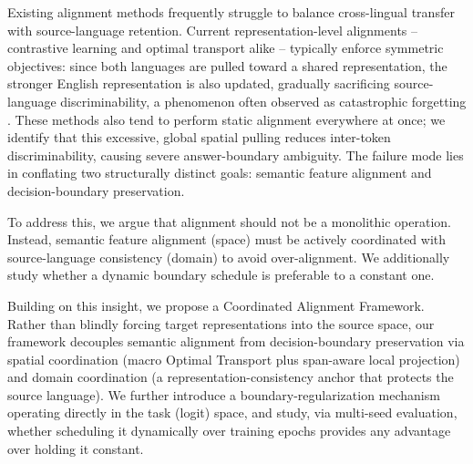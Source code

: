 \documentclass[11pt]{article}
\begin{document}
Existing alignment methods frequently struggle to balance cross-lingual transfer with source-language retention. Current representation-level alignments -- contrastive learning and optimal transport alike -- typically enforce symmetric objectives: since both languages are pulled toward a shared representation, the stronger English representation is also updated, gradually sacrificing source-language discriminability, a phenomenon often observed as catastrophic forgetting \citep{Kirkpatrick_2017, koloski2025measuringcatastrophicforgettingcrosslingual}. These methods also tend to perform static alignment everywhere at once; we identify that this excessive, global spatial pulling reduces inter-token discriminability, causing severe answer-boundary ambiguity. The failure mode lies in conflating two structurally distinct goals: semantic feature alignment and decision-boundary preservation.

To address this, we argue that alignment should not be a monolithic operation. Instead, semantic feature alignment (space) must be actively coordinated with source-language consistency (domain) to avoid over-alignment. We additionally study whether a dynamic boundary schedule is preferable to a constant one.

Building on this insight, we propose a Coordinated Alignment Framework. Rather than blindly forcing target representations into the source space, our framework decouples semantic alignment from decision-boundary preservation via spatial coordination (macro Optimal Transport plus span-aware local projection) and domain coordination (a representation-consistency anchor that protects the source language). We further introduce a boundary-regularization mechanism operating directly in the task (logit) space, and study, via multi-seed evaluation, whether scheduling it dynamically over training epochs provides any advantage over holding it constant.
\end{document}
